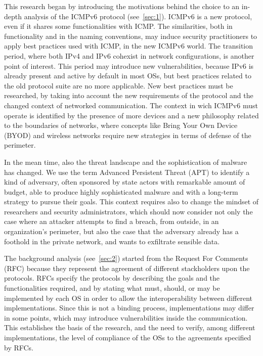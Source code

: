 \documentclass[12pt]{article}
\begin{document}
This research began by introducing the motivations behind the choice to an in-depth analysis of the ICMPv6 protocol (see~\cref{sec:1}). ICMPv6 is a new protocol, even if it shares some functionalities with ICMP. The similarities, both in functionality and in the naming conventions, may induce security practitioners to apply best practices used with ICMP, in the new ICMPv6 world. The transition period, where both IPv4 and IPv6 cohexist in network configurations, is another point of interest. This period may introduce new vulnerabilities, because IPv6 is already present and active by default in most OSs, but best practices related to the old protocol suite are no more applicable. New best practices must be researched, by taking into account the new requirements of the protocol and the changed context of networked communication. The context in wich ICMPv6 must operate is identified by the presence of more devices and a new philosophy related to the boundaries of networks, where concepts like Bring Your Own Device (BYOD) and wireless networks require new strategies in terms of defense of the perimeter.

In the mean time, also the threat landscape and the sophistication of malware has changed. We use the term Advanced Persistent Threat (APT) to identify a kind of adversary, often sponsored by state actors with remarkable amount of budget, able to produce highly sophisticated malware and with a long-term strategy to pursue their goals. This context requires also to change the mindset of researchers and security administrators, which should now consider not only the case where an attacker attempts to find a breach, from outside, in an organization's perimeter, but also the case that the adversary already has a foothold in the private network, and wants to exfiltrate sensible data.

The background analysis (see~\cref{sec:2}) started from the Request For Comments (RFC) because they represent the agreement of different stackholders upon the protocols. RFCs specify the protocols by describing the goals and the functionalities required, and by stating what must, should, or may be implemented by each OS in order to allow the interoperability between different implementations. Since this is not a binding process, implementations may differ in some points, which may introduce vulnerabilities inside the communication. This establishes the basis of the research, and the need to verify, among different implementations, the level of compliance of the OSs to the agreements specified by RFCs.
\end{document}
